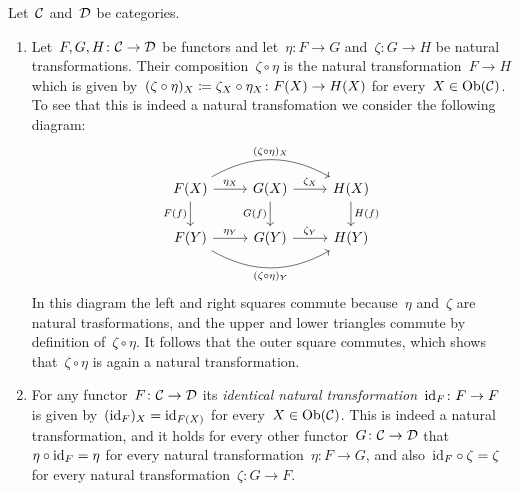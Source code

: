 \begin{remark}
  Let~$\mathcal{C}$ and~$\mathcal{D}$ be categories.
  \begin{enumerate}
    \item
      Let~$F, G, H \colon \mathcal{C} \to \mathcal{D}$ be functors and let~$\eta \colon F \to G$ and~$\zeta \colon G \to H$ be natural transformations.
      Their composition~$\zeta \circ \eta$ is the natural transformation~$F \to H$ which is given by~$(\zeta \circ \eta)_X \coloneqq \zeta_X \circ \eta_X \colon F(X) \to H(X)$ for every~$X \in \operatorname{Ob}(\mathcal{C})$.
      To see that this is indeed a natural transfomation we consider the following diagram:
      \[
        \begin{tikzcd}
            F(X)
            \arrow[bend left]{rr}[above]{(\zeta \circ \eta)_X}
            \arrow{r}[above]{\eta_X}
            \arrow{d}[left]{F(f)}
          & G(X)
            \arrow{r}[above]{\zeta_X}
            \arrow{d}[left]{G(f)}
          & H(X)
            \arrow{d}[right]{H(f)}
          \\
            F(Y)
            \arrow{r}[above]{\eta_Y}
            \arrow[bend right]{rr}[below]{(\zeta \circ \eta)_Y}
          & G(Y)
            \arrow{r}[above]{\zeta_Y}
          & H(Y)
        \end{tikzcd}
      \]
      In this diagram the left and right squares commute because~$\eta$ and~$\zeta$ are natural trasformations, and the upper and lower triangles commute by definition of~$\zeta \circ \eta$.
      It follows that the outer square commutes, which shows that~$\zeta \circ \eta$ is again a natural transformation.
    \item
      For any functor~$F \colon \mathcal{C} \to \mathcal{D}$ its \emph{identical natural transformation}~$\mathrm{id}_F \colon F \to F$ is given by~$(\mathrm{id}_F)_X = \mathrm{id}_{F(X)}$ for every~$X \in \operatorname{Ob}(\mathcal{C})$.
      This is indeed a natural transformation, and it holds for every other functor~$G \colon \mathcal{C} \to \mathcal{D}$ that~$\eta \circ \mathrm{id}_F = \eta$ for every natural transformation~$\eta \colon F \to G$, and also~$\mathrm{id}_F \circ \zeta = \zeta$ for every natural transformation~$\zeta \colon G \to F$.
  \end{enumerate}
\end{remark}


